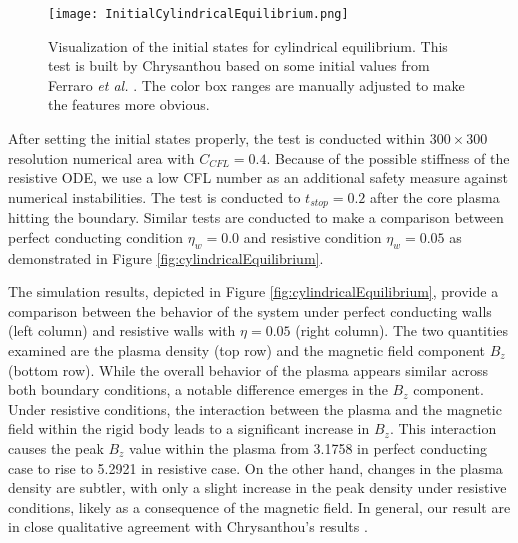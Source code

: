 \begin{figure}[H]
	\centering
	\texttt{[image: InitialCylindricalEquilibrium.png]}
	\caption[Initial states of cylindrical equilibrium]{Visualization of the initial states for cylindrical equilibrium. This test is built by Chrysanthou \cite{chrysanthou2020} based on some initial values from Ferraro \textit{et al.} \cite{ferraro2016multi}. The color box ranges are manually adjusted to make the features more obvious.}
	\label{fig:cylindricalEquilibriumInitial}
\end{figure}

After setting the initial states properly, the test is conducted within $300\times300$ resolution numerical area with $C_{CFL}=0.4$. Because of the possible stiffness of the resistive ODE, we use a low CFL number as an additional safety measure against numerical instabilities. The test is conducted to $t_{stop}=0.2$ after the core plasma hitting the boundary. Similar tests are conducted to make a comparison between perfect conducting condition $\eta_w=0.0$ and resistive condition $\eta_w=0.05$ as demonstrated in Figure \ref{fig:cylindricalEquilibrium}. 

The simulation results, depicted in Figure \ref{fig:cylindricalEquilibrium}, provide a comparison between the behavior of the system under perfect conducting walls (left column) and resistive walls with $\eta=0.05$ (right column). The two quantities examined are the plasma density (top row) and the magnetic field component $B_z$ (bottom row). While the overall behavior of the plasma appears similar across both boundary conditions, a notable difference emerges in the $B_z$ component. Under resistive conditions, the interaction between the plasma and the magnetic field within the rigid body leads to a significant increase in $B_z$.  This interaction causes the peak $B_z$ value within the plasma from 3.1758 in perfect conducting case to rise to 5.2921 in resistive case. On the other hand, changes in the plasma density are subtler, with only a slight increase in the peak density under resistive conditions, likely as a consequence of the magnetic field. In general, our result are in close qualitative agreement with Chrysanthou's results \cite{chrysanthou2020}.

